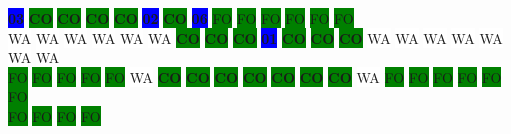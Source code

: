 \colorbox{blue}{\color[rgb]{1,0,0}\textbf{03}}%
\colorbox{green}{\color[rgb]{0,0,0}\textbf{CO}}%
\colorbox{green}{\color[rgb]{0,0,0}\textbf{CO}}%
\colorbox{green}{\color[rgb]{0,0,0}\textbf{CO}}%
\colorbox{green}{\color[rgb]{0,0,0}\textbf{CO}}%
\colorbox{blue}{\color[rgb]{1,0,0}\textbf{02}}%
\colorbox{green}{\color[rgb]{0,0,0}\textbf{CO}}%
\colorbox{blue}{\color[rgb]{1,0,0}\textbf{06}}%
\colorbox{green}{\color[gray]{0.75}FO}%
\colorbox{green}{\color[gray]{0.75}FO}%
\colorbox{green}{\color[gray]{0.75}FO}%
\colorbox{green}{\color[gray]{0.75}FO}%
\colorbox{green}{\color[gray]{0.75}FO}%
\colorbox{green}{\color[gray]{0.75}FO}%
\\
\colorbox{white}{\color[gray]{0.5}WA}%
\colorbox{white}{\color[gray]{0.5}WA}%
\colorbox{white}{\color[gray]{0.5}WA}%
\colorbox{white}{\color[gray]{0.5}WA}%
\colorbox{white}{\color[gray]{0.5}WA}%
\colorbox{white}{\color[gray]{0.5}WA}%
\colorbox{green}{\color[rgb]{0,0,0}\textbf{CO}}%
\colorbox{green}{\color[rgb]{0,0,0}\textbf{CO}}%
\colorbox{green}{\color[rgb]{0,0,0}\textbf{CO}}%
\colorbox{blue}{\color[rgb]{1,0,0}\textbf{01}}%
\colorbox{green}{\color[rgb]{0,0,0}\textbf{CO}}%
\colorbox{green}{\color[rgb]{0,0,0}\textbf{CO}}%
\colorbox{green}{\color[rgb]{0,0,0}\textbf{CO}}%
\colorbox{white}{\color[gray]{0.5}WA}%
\colorbox{white}{\color[gray]{0.5}WA}%
\colorbox{white}{\color[gray]{0.5}WA}%
\colorbox{white}{\color[gray]{0.5}WA}%
\colorbox{white}{\color[gray]{0.5}WA}%
\colorbox{white}{\color[gray]{0.5}WA}%
\colorbox{white}{\color[gray]{0.5}WA}%
\\
\colorbox{green}{\color[gray]{0.75}FO}%
\colorbox{green}{\color[gray]{0.75}FO}%
\colorbox{green}{\color[gray]{0.75}FO}%
\colorbox{green}{\color[gray]{0.75}FO}%
\colorbox{green}{\color[gray]{0.75}FO}%
\colorbox{white}{\color[gray]{0.5}WA}%
\colorbox{green}{\color[rgb]{0,0,0}\textbf{CO}}%
\colorbox{green}{\color[rgb]{0,0,0}\textbf{CO}}%
\colorbox{green}{\color[rgb]{0,0,0}\textbf{CO}}%
\colorbox{green}{\color[rgb]{0,0,0}\textbf{CO}}%
\colorbox{green}{\color[rgb]{0,0,0}\textbf{CO}}%
\colorbox{green}{\color[rgb]{0,0,0}\textbf{CO}}%
\colorbox{green}{\color[rgb]{0,0,0}\textbf{CO}}%
\colorbox{white}{\color[gray]{0.5}WA}%
\colorbox{green}{\color[gray]{0.75}FO}%
\colorbox{green}{\color[gray]{0.75}FO}%
\colorbox{green}{\color[gray]{0.75}FO}%
\colorbox{green}{\color[gray]{0.75}FO}%
\colorbox{green}{\color[gray]{0.75}FO}%
\colorbox{green}{\color[gray]{0.75}FO}%
\\
\colorbox{green}{\color[gray]{0.75}FO}%
\colorbox{green}{\color[gray]{0.75}FO}%
\colorbox{green}{\color[gray]{0.75}FO}%
\colorbox{green}{\color[gray]{0.75}FO}%
